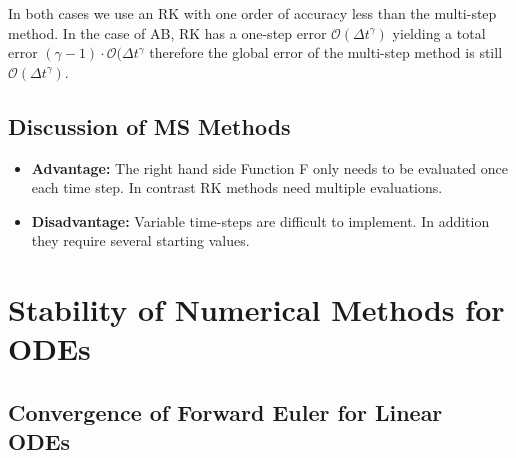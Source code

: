 \documentclass[10pt,a4paper]{scrartcl}
\begin{document}
\begin{multicols*}{3}
In both cases we use an RK with one order of accuracy less than the multi-step method. In the case of AB, RK has a one-step error $\mathcal{O}(\Delta t^\gamma)$ yielding a total error $(\gamma-1)\cdot \mathcal{O}(\Delta t^\gamma$ therefore the global error of the multi-step method is still $\mathcal{O}(\Delta t^\gamma)$.

\subsection{Discussion of MS Methods}

\begin{itemize}
\item \textbf{Advantage:} The right hand side Function F only needs to be evaluated once each time step. In contrast RK methods need multiple evaluations.
\item \textbf{Disadvantage:} Variable time-steps are difficult to implement. In addition they require several starting values.
\end{itemize}

\section{Stability of Numerical Methods for ODEs}





\subsection{Convergence of Forward Euler for Linear ODEs}

\begin{multicols*}{2}

\end{multicols*}


\end{multicols*}
\end{document}
